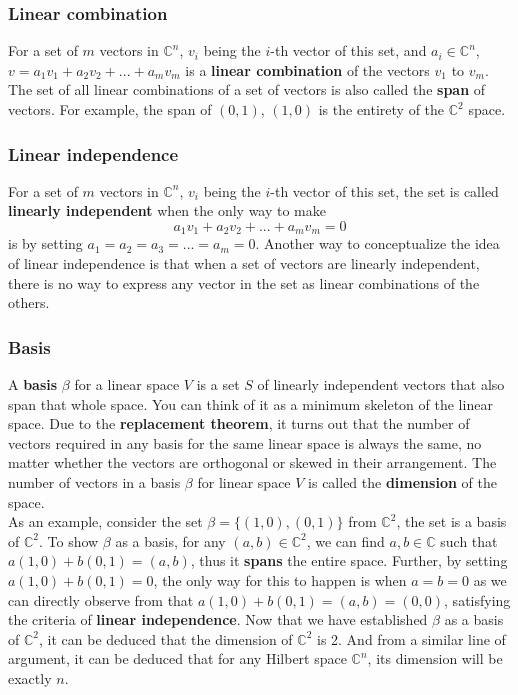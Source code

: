 \documentclass[12pt]{article}
\begin{document}
\subsubsection{Linear combination}
For a set of $m$ vectors in $\mathbb{C}^n$, $v_i$ being the $i$-th vector of this set, and $a_i \in \mathbb{C}^n$, $v=a_1v_1+a_2v_2+...+a_mv_m$ is a \textbf{linear combination} of the vectors $v_1$ to $v_m$. The set of all linear combinations of a set of vectors is also called the \textbf{span} of vectors. For example, the span of $(0,1)$, $(1,0)$ is the entirety of the $\mathbb{C}^2$ space.
\subsubsection{Linear independence}
For a set of $m$ vectors in $\mathbb{C}^n$, $v_i$ being the $i$-th vector of this set, the set is called \textbf{linearly independent} when the only way to make $$a_1v_1+a_2v_2+...+a_mv_m=0$$ is by setting $a_1=a_2=a_3=...=a_m=0$. Another way to conceptualize the idea of linear independence is that when a set of vectors are linearly independent, there is no way to express any vector in the set as linear combinations of the others.
\subsubsection{Basis}
A \textbf{basis} $\beta$ for a linear space $V$ is a set $S$ of linearly independent vectors that also span that whole space. You can think of it as a minimum skeleton of the linear space. Due to the \textbf{replacement theorem}, it turns out that the number of vectors required in any basis for the same linear space is always the same, no matter whether the vectors are orthogonal or skewed in their arrangement. The number of vectors in a basis $\beta$ for linear space $V$ is called the \textbf{dimension} of the space.\\

\noindent As an example, consider the set $\beta = \{(1,0),(0,1)\}$ from $\mathbb{C}^2$, the set is a basis of $\mathbb{C}^2$. To show $\beta$ as a basis, for any $(a,b)\in \mathbb{C}^2$, we can find $a, b\in \mathbb{C}$ such that $a(1,0)+b(0,1)=(a,b)$, thus it \textbf{spans} the entire space. Further, by setting $a(1,0)+b(0,1)=0$, the only way for this to happen is when $a=b=0$ as we can directly observe from that $a(1,0)+b(0,1)=(a,b)=(0,0)$, satisfying the criteria of \textbf{linear independence}. Now that we have established $\beta$ as a basis of $\mathbb{C}^2$, it can be deduced that the dimension of $\mathbb{C}^2$ is 2. And from a similar line of argument, it can be deduced that for any Hilbert space $\mathbb{C}^n$, its dimension will be exactly $n$.
\end{document}
